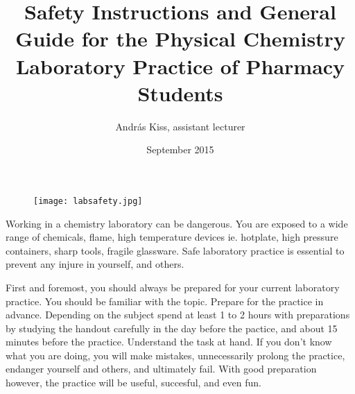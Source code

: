 \documentclass{article}
\begin{document}
\begin{figure}
  \centering
  \texttt{[image: labsafety.jpg]}
\end{figure}

\title{Safety Instructions and General Guide for the Physical Chemistry Laboratory Practice of Pharmacy Students}
\author{Andr\'{a}s Kiss, assistant lecturer}
\date{September 2015}
\maketitle

Working in a chemistry laboratory can be dangerous. You are exposed to a wide range of chemicals, flame, high temperature devices ie. hotplate, high pressure containers, sharp tools, fragile glassware. Safe laboratory practice is essential to prevent any injure in yourself, and others.

First and foremost, you should always be prepared for your current laboratory practice. You should be familiar with the topic. Prepare for the practice in advance. Depending on the subject spend at least 1 to 2 hours with preparations by studying the handout carefully in the day before the pactice, and about 15 minutes before the practice. Understand the task at hand. If you don't know what you are doing, you will make mistakes, unnecessarily prolong the practice, endanger yourself and others, and ultimately fail. With good preparation however, the practice will be useful, succesful, and even fun.
\end{document}

